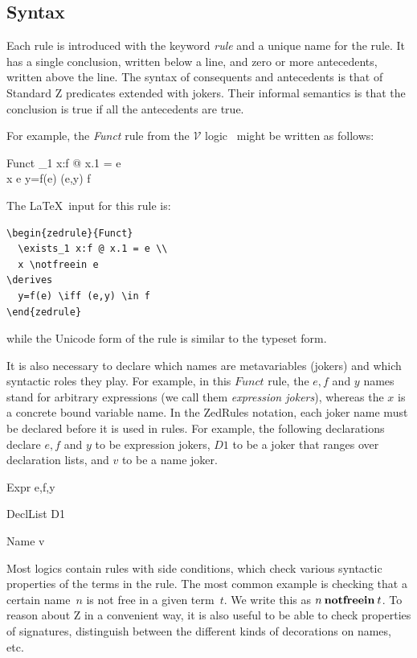 \documentclass{entcs}
\newcommand{\V}{\mathcal{V}}
\begin{document}
\subsection{Syntax}

Each rule is introduced with the keyword \emph{rule} and a unique name
for the rule.  It has a single conclusion, written below a line, and
zero or more antecedents, written above the line.  The syntax of
consequents and antecedents is that of Standard Z predicates extended
with jokers.  Their informal semantics is that the conclusion is true
if all the antecedents are true.

For example, the \emph{Funct} rule from the $\V$
logic~\cite{brien:calculus-schemas-z00} might be written as follows:
\begin{zedrule}{Funct}
  \exists_1 x:f @ x.1 = e \\
  x \notfreein e
\derives
  y=f(e) \iff (e,y) \in f
\end{zedrule}

The \LaTeX\ input for this rule is:
\begin{verbatim}
\begin{zedrule}{Funct}
  \exists_1 x:f @ x.1 = e \\
  x \notfreein e
\derives
  y=f(e) \iff (e,y) \in f
\end{zedrule}
\end{verbatim}
while the Unicode form of the rule is similar to the typeset form.

It is also necessary to declare which names are metavariables
(jokers) and which syntactic roles they play.  For example, in
this $Funct$ rule, the $e,f$ and $y$ names stand for arbitrary
expressions (we call them \emph{expression jokers}), whereas the $x$
is a concrete bound variable name.  In the ZedRules notation, each
joker name must be declared before it is used in rules.  For example,
the following declarations declare $e,f$ and $y$ to be expression
jokers, $D1$ to be a joker that ranges over declaration lists, and
$v$ to be a name joker.

\begin{zedjoker}{Expr} e,f,y \end{zedjoker}
\begin{zedjoker}{DeclList} D1 \end{zedjoker}
\begin{zedjoker}{Name} v \end{zedjoker}

Most logics contain rules with side conditions, which check various
syntactic properties of the terms in the rule.  The most common
example is checking that a certain name~$n$ is not free in a given
term~$t$.  We write this as $n \mathbin{\mathop{\mathstrut{\mbox{\textbf{notfreein}}}}\nolimits} t$.  To reason about Z in a
convenient way, it is also useful to be able to check properties of
signatures, distinguish between the different kinds of decorations on
names, etc.
\end{document}
